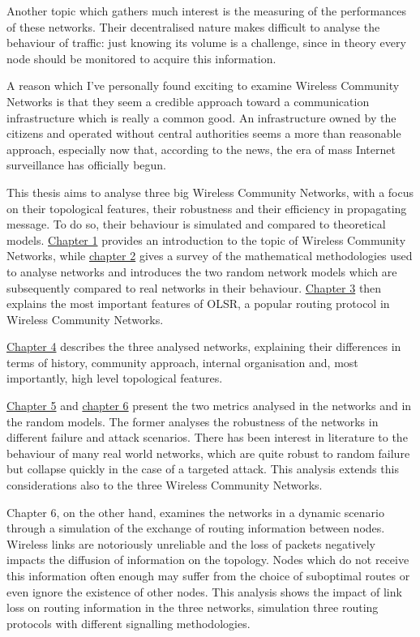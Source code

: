 \documentclass[a4paper,11pt,twoside,openright]{memoir}
\begin{document}
Another topic which gathers much interest is the measuring of the performances
of these networks. Their decentralised nature makes difficult to analyse
the behaviour of traffic: just knowing its volume is a challenge, since in
theory every node should be monitored to acquire this information.

A reason which I've personally found exciting to examine Wireless Community
Networks is that they seem a credible approach toward a communication
infrastructure which is really a common good. An infrastructure owned by the
citizens and operated without central authorities seems a more than reasonable
approach, especially now that, according to the news, the era of mass Internet
surveillance has officially begun.

This thesis aims to analyse three big Wireless Community Networks, with a
focus on their topological features, their robustness and their efficiency
in propagating message. To do so, their behaviour is simulated and
compared to theoretical models.
\hyperref[wireless-community-networks]{Chapter 1} provides an introduction to
the topic of Wireless Community Networks, while
\hyperref[network-topology-and-graphs]{chapter 2} gives a survey of the
mathematical methodologies used to analyse networks
and introduces the two random network models which are subsequently
compared to real networks in their behaviour.
\hyperref[olsr-survey]{Chapter 3} then explains the most important 
features of OLSR, a popular routing protocol in Wireless Community Networks.

\hyperref[the-networks]{Chapter 4} describes the three analysed networks,
explaining their differences in terms
of history, community approach, internal organisation and, most importantly,
high level topological features.

\hyperref[robustness-analysis]{Chapter 5} and
\hyperref[message-propagation-analysis]{chapter 6} present the two metrics
analysed in the networks and in the random models.
The former analyses the robustness of the networks in different failure and
attack scenarios. There has been interest in literature to the behaviour
of many real world networks, which are quite robust to random failure but
collapse quickly in the case of a targeted attack. This analysis
extends this considerations also to the three Wireless Community Networks.

Chapter 6, on the other hand, examines the networks in a dynamic scenario
through a simulation of the exchange of routing information between nodes.
Wireless links are notoriously unreliable and the loss of packets negatively
impacts the diffusion of information on the topology.
Nodes which do not receive this information often enough may suffer from the
choice of suboptimal routes or even ignore the existence of other nodes.
This analysis shows the impact of link loss on routing information
in the three networks, simulation three routing protocols with different
signalling methodologies.
\end{document}
